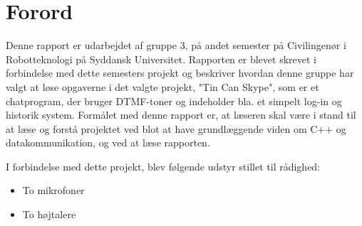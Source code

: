 \section{Forord}
Denne rapport er udarbejdet af gruppe 3, på andet semester på Civilingenør i Robotteknologi på Syddansk Universitet.
Rapporten er blevet skrevet i forbindelse med dette semesters projekt og beskriver hvordan denne gruppe har valgt at løse opgaverne i det valgte projekt, "Tin Can Skype", som er et chatprogram, der bruger DTMF-toner og indeholder bla. et simpelt log-in og historik system. 
\newline
Formålet med denne rapport er, at læseren skal være i stand til at læse og forstå projektet ved blot at have grundlæggende viden om C++ og datakommunikation, og ved at læse rapporten. 
\newline
\par
I forbindelse med dette projekt, blev følgende udstyr stillet til rådighed:
\begin{itemize}
	\item To mikrofoner
	\item To højtalere
\end{itemize}

